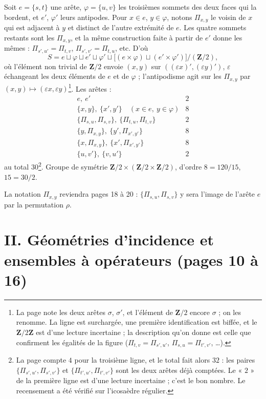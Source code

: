 \documentclass[11pt,a4paper]{article}
\begin{document}
Soit $e = \{s, t\}$ une arête, $\varphi = \{u, v\}$ les troisièmes sommets des
deux faces qui la bordent, et $e'$, $\varphi'$ leurs antipodes. Pour $x \in e$,
$y \in \varphi$, notons $\Pi_{x,y}$ le voisin de $x$ qui est adjacent à $y$ et
distinct de l'autre extrémité de $e$. Les quatre sommets restants sont les
$\Pi_{x,y}$, et la même construction faite à partir de $e'$ donne les mêmes :
$\Pi_{s',u'} = \Pi_{t,v}$, $\Pi_{s',v'} = \Pi_{t,u}$, etc. D'où
\[
S = e \sqcup \varphi \sqcup e' \sqcup \varphi' \sqcup \bigl[(e \times \varphi)
\sqcup (e' \times \varphi')\bigr] / (\mathbf{Z}/2) ,
\]
où l'élément non trivial de $\mathbf{Z}/2$ envoie $(x, y)$ sur
$((\varepsilon x)', (\varepsilon y)')$, $\varepsilon$ échangeant les deux
éléments de $e$ et de $\varphi$ ; l'antipodisme agit sur les $\Pi_{x,y}$ par
$(x, y) \mapsto (\varepsilon x, \varepsilon y)$\footnote{La page note les deux
arêtes $\sigma$, $\sigma'$, et l'élément de $\mathbf{Z}/2$ encore $\sigma$ ; on
les renomme. La ligne est surchargée, une première identification est biffée,
et le $\mathbf{Z}/2\mathbf{Z}$ est d'une lecture incertaine ; la description
qu'on donne est celle que confirment les égalités de la figure
($\Pi_{t,v} = \Pi_{s',u'}$, $\Pi_{s,u} = \Pi_{t',v'}$, …).}. Les arêtes :
\[
\begin{array}{lr}
e,\ e' & 2 \\
\{x, y\},\ \{x', y'\} \quad (x \in e,\ y \in \varphi) & 8 \\
\{\Pi_{s,u}, \Pi_{s,v}\},\ \{\Pi_{t,u}, \Pi_{t,v}\} & 2 \\
\{y, \Pi_{x,y}\},\ \{y', \Pi_{x',y'}\} & 8 \\
\{x, \Pi_{x,y}\},\ \{x', \Pi_{x',y'}\} & 8 \\
\{u, v'\},\ \{v, u'\} & 2
\end{array}
\]
au total $30$\footnote{La page compte $4$ pour la troisième ligne, et le total
fait alors $32$ : les paires $\{\Pi_{s',u'}, \Pi_{s',v'}\}$ et
$\{\Pi_{t',u'}, \Pi_{t',v'}\}$ sont les deux arêtes déjà comptées. Le « $2$ »
de la première ligne est d'une lecture incertaine ; c'est le bon nombre. Le
recensement a été vérifié sur l'icosaèdre régulier.}. Groupe de symétrie
$\mathbf{Z}/2 \times (\mathbf{Z}/2 \times \mathbf{Z}/2)$, d'ordre $8 = 120/15$,
$15 = 30/2$.

La notation $\Pi_{x,y}$ reviendra pages 18 à 20 : $\{\Pi_{s,u},
\Pi_{s,v}\}$ y sera l'image de l'arête $e$ par la permutation $\rho$.

\section*{II. Géométries d'incidence et ensembles à opérateurs (pages 10 à 16)}
\end{document}
